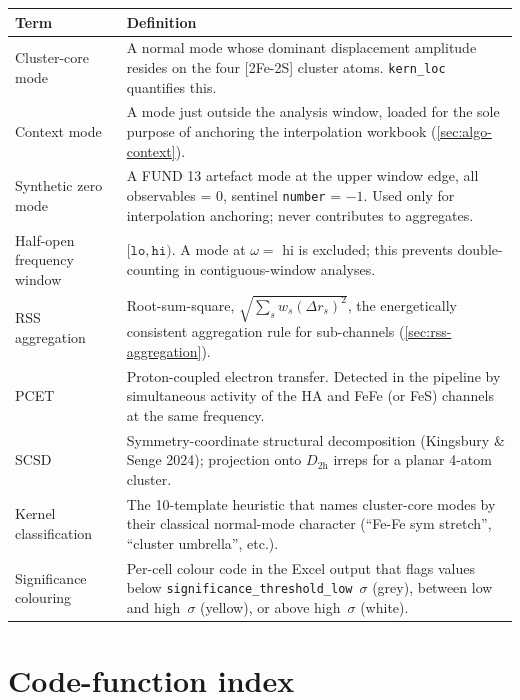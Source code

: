 \documentclass[10pt,a4paper,twoside]{article}
\newcommand{\fn}[1]{\texttt{#1}}
\newcommand{\cfgkey}[1]{\texttt{#1}}
\begin{document}
\begin{longtable}{p{} p{}}
\toprule
\textbf{Term} & \textbf{Definition} \\
\midrule
Cluster-core mode
 & A normal mode whose dominant displacement amplitude resides on
   the four \mbox{[2Fe-2S]} cluster atoms.
   \fn{kern\_loc} quantifies this. \\
Context mode
 & A mode just outside the analysis window, loaded for the sole
   purpose of anchoring the interpolation workbook
   (\cref{sec:algo-context}). \\
Synthetic zero mode
 & A FUND 13 artefact mode at the upper window edge, all observables
   = 0, sentinel \texttt{number} = $-1$. Used only for
   interpolation anchoring; never contributes to aggregates. \\
Half-open frequency window
 & $[\texttt{lo}, \texttt{hi})$. A mode at $\omega = $ hi is
   excluded; this prevents double-counting in contiguous-window
   analyses. \\
RSS aggregation
 & Root-sum-square,
   $\sqrt{\sum_s w_s (\Delta r_s)^2}$, the energetically consistent
   aggregation rule for sub-channels
   (\cref{sec:rss-aggregation}). \\
PCET
 & Proton-coupled electron transfer. Detected in the pipeline by
   simultaneous activity of the HA and FeFe (or FeS) channels at
   the same frequency. \\
SCSD
 & Symmetry-coordinate structural decomposition
   (Kingsbury \& Senge 2024); projection onto $D_{2\mathrm{h}}$
   irreps for a planar 4-atom cluster. \\
Kernel classification
 & The 10-template heuristic that names cluster-core modes by their
   classical normal-mode character
   (``Fe-Fe sym stretch'', ``cluster umbrella'', etc.). \\
Significance colouring
 & Per-cell colour code in the Excel output that flags values
   below \cfgkey{significance\_threshold\_low}~$\sigma$ (grey),
   between low and high~$\sigma$ (yellow), or above
   high~$\sigma$ (white). \\
\bottomrule
\end{longtable}

\section*{Code-function index}
\end{document}
